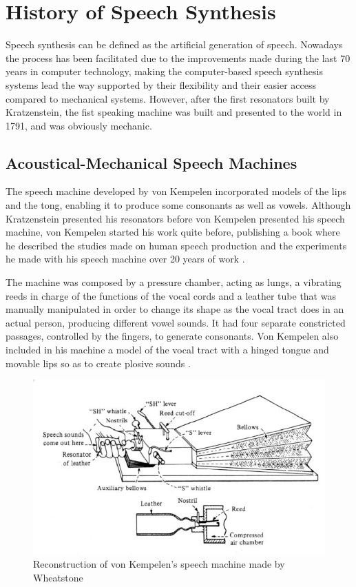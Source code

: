 \section{History of Speech Synthesis}
\label{history_speech_synthesis}
Speech synthesis can be defined as the artificial generation of speech. Nowadays the process has been facilitated due to the improvements made during the last 70 years in computer technology, making the computer-based speech synthesis systems lead the way supported by their flexibility and their easier access compared to mechanical systems. However, after the first resonators built by Kratzenstein, the fist speaking machine was built and presented to the world in 1791, and was obviously mechanic.

\subsection{Acoustical-Mechanical Speech Machines}
\label{history_mechanical_machines}
The speech machine developed by von Kempelen incorporated models of the lips and the tong, enabling it to produce some consonants as well as vowels. Although Kratzenstein presented his resonators before von Kempelen presented his speech machine, von Kempelen started his work quite before, publishing a book where he described the studies made on human speech production and the experiments he made with his speech machine over 20 years of work \cite{vonKempelen}.  

The machine was composed by a pressure chamber, acting as lungs, a vibrating reeds in charge of the functions of the vocal cords and a leather tube that was manually manipulated in order to change its shape as the vocal tract does in an actual person, producing different vowel sounds. It had four separate constricted passages, controlled by the fingers, to generate consonants. Von Kempelen also included in his machine a model of the vocal tract with a hinged tongue and movable lips so as to create plosive sounds \cite{Schroeder93, LemmettyMSc, flanagan_1973_speech}. 

\begin{figure}[htb]
	\begin{center}
		\includegraphics[width=\textwidth]{images/von_kempelen_machine.jpg}
		\caption{Reconstruction of von Kempelen's speech machine made by Wheatstone \cite{flanagan_book}}
		\label{fig:speech_machine}
	\end{center}
\end{figure}

